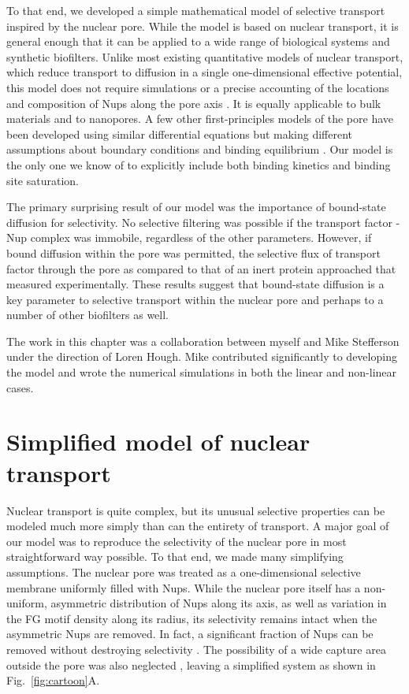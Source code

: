 To that end, we developed a simple mathematical model of selective transport inspired by the nuclear pore.  While the model is based on nuclear transport, it is general enough that it can be applied to a wide range of biological systems and synthetic biofilters.  Unlike most existing quantitative models of nuclear transport, which reduce transport to diffusion in a single one-dimensional effective potential, this model does not require simulations or a precise accounting of the locations and composition of Nups along the pore axis \cite{pulupa17, vovk16,tagliazucchi13, tu13, timney16}.  It is equally applicable to bulk materials and to nanopores.  A few other first-principles models of the pore have been developed using similar differential equations but making different assumptions about boundary conditions and binding equilibrium \cite{zilman07,yang18}.  Our model is the only one we know of to explicitly include both binding kinetics and binding site saturation.

The primary surprising result of our model was the importance of bound-state diffusion for selectivity.  No selective filtering was possible if the transport factor - Nup complex was immobile, regardless of the other parameters.  However, if bound diffusion within the pore was permitted, the selective flux of transport factor through the pore as compared to that of an inert protein approached that measured experimentally.  These results suggest that bound-state diffusion is a key parameter to selective transport within the nuclear pore and perhaps to a number of other biofilters as well.

The work in this chapter was a collaboration between myself and Mike Stefferson under the direction of Loren Hough.  Mike contributed significantly to developing the model and wrote the numerical simulations in both the linear and non-linear cases.

\section{Simplified model of nuclear transport}
\label{sec:model}

Nuclear transport is quite complex, but its unusual selective properties can be modeled much more simply than can the entirety of transport.  A major goal of our model was to reproduce the selectivity of the nuclear pore in most straightforward way possible.  To that end, we made many simplifying assumptions.  The nuclear pore was treated as a one-dimensional selective membrane uniformly filled with Nups.  While the nuclear pore itself has a non-uniform, asymmetric distribution of Nups along its axis, as well as variation in the FG motif density along its radius, its selectivity remains intact when the asymmetric Nups are removed.  In fact, a significant fraction of Nups can be removed without destroying selectivity \cite{strawn04, zeitler04,kowalczyk11, jovanovic-talisman09}.  The possibility of a wide capture area outside the pore was also neglected \cite{pagliara14}, leaving a simplified system as shown in Fig.~\ref{fig:cartoon}A.

